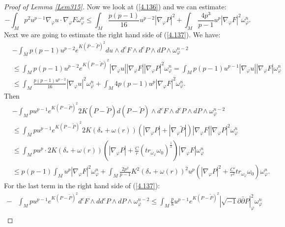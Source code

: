 \documentclass[10pt,a4paper]{amsart}
\begin{document}
\begin{proof}[Proof of Lemma \ref{Lem315}]
Now we look at (\ref{4.136}) and we can estimate:
\begin{equation}\label{4.143}
-\int_Mp^2u^{p-1}\nabla_{\varphi}u\cdot \nabla_{\varphi}F\omega_{\varphi}^n\le \int_M\frac{p(p-1)}{16}u^{p-2}|\nabla_{\varphi}P|^2+\int_M\frac{4p^3}{p-1}u^p|\nabla_{\varphi}F|^2\omega_{\varphi}^n.
\end{equation}
Next we are going to estimate the right hand side of (\ref{4.137}).
We have:
\begin{equation*}
\begin{split}
&-\int_Mp(p-1)u^{p-2}e^{K(P-\tilde{P})^2}du\wedge d^cF\wedge d^cP\wedge dP\wedge \omega_{\varphi}^{n-2}\\
&\le \int_Mp(p-1)u^{p-2}e^{K(P-\tilde{P})^2}|\nabla_{\varphi}u||\nabla_{\varphi}F||\nabla_{\varphi}P|^2\omega_{\varphi}^n=\int_Mp(p-1)u^{p-1}|\nabla_{\varphi}u||\nabla_{\varphi}F|\omega_{\varphi}^n\\
&\le \int_M\frac{p(p-1)u^{p-2}}{16}|\nabla_{\varphi}u|^2\omega_{\varphi}^n+\int_M4p(p-1)u^p|\nabla_{\varphi}F|^2\omega_{\varphi}^n.
\end{split}
\end{equation*}
Then
\begin{equation*}
\begin{split}
&-\int_Mpu^{p-1}e^{K(P-\tilde{P})^2}2K(P-\tilde{P})d(P-\tilde{P})\wedge d^cF\wedge d^cP\wedge dP\wedge \omega_{\varphi}^{n-2}\\
&\le \int_Mpu^{p-1}e^{K(P-\tilde{P})^2}2K(\delta_*+\omega(r))(|\nabla_{\varphi}P|+|\nabla_{\varphi}\tilde{P}|)|\nabla_{\varphi}F||\nabla_{\varphi}P|^2\omega_{\varphi}^n\\
&\le\int_Mpu^p\cdot 2K(\delta_*+\omega(r))(|\nabla_{\varphi}P|+\frac{C}{r}(tr_{\omega_{\varphi}}\omega_0)^{\frac{1}{2}})|\nabla_{\varphi}F|\omega_{\varphi}^n\\
&\le p(p-1)\int_Mu^p|\nabla_{\varphi}F|^2\omega_{\varphi}^n+\int_M\frac{2p^2}{p-1}K^2(\delta_*+\omega(r))^2u^p(|\nabla_{\varphi}P|^2+\frac{C'}{r^2}tr_{\omega_{\varphi}}\omega_0)\omega_{\varphi}^n.
\end{split}
\end{equation*}
For the last term in the right hand side of (\ref{4.137}):
\begin{equation*}
\begin{split}
-&\int_Mpu^{p-1}e^{K(P-\tilde{P})^2}d^cF\wedge dd^cP\wedge dP\wedge \omega_{\varphi}^{n-2}\le \int_M\frac{p}{8}u^{p-1}e^{K(P-\tilde{P})^2}|\sqrt{-1}\partial\bar{\partial}P|^2_{\varphi}\omega_{\varphi}^n\\

\end{split}
\end{equation*}
\end{proof}
\end{document}
